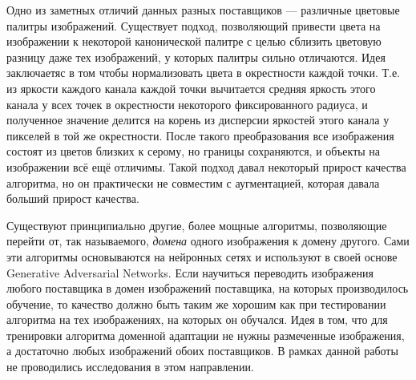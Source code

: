Одно из заметных отличий данных разных поставщиков --- различные цветовые
палитры изображений. Существует подход, позволяющий привести цвета на
изображении к некоторой канонической палитре с целью сблизить цветовую разницу
даже тех изображений, у которых палитры сильно отличаются. Идея заключаетяс в
том чтобы нормализовать цвета в окрестности каждой точки. Т.е. из яркости
каждого канала каждой точки вычитается средняя яркость этого канала у всех точек
в окрестности некоторого фиксированного радиуса, и полученное значение делится
на корень из дисперсии яркостей этого канала у пикселей в той же окрестности.
После такого преобразования все изображения состоят из цветов близких к серому,
но границы сохраняются, и объекты на изображении всё ещё отличимы. Такой подход
давал некоторый прирост качества алгоритма, но он практически не совместим с
аугментацией, которая давала больший прирост качества.

Существуют принципиально другие, более мощные алгоритмы, позволяющие перейти от,
так называемого, \textit{домена} одного изображения к домену другого. Сами эти
алгоритмы основываются на нейронных сетях и используют в своей основе Generative
Adversarial Networks. Если научиться переводить изображения любого поставщика в
домен изображений поставщика, на которых производилось обучение, то качество
должно быть таким же хорошим как при тестировании алгоритма на тех изображениях,
на которых он обучался. Идея в том, что для тренировки алгоритма доменной
адаптации не нужны размеченные изображения, а достаточно любых изображений обоих
поставщиков. В рамках данной работы не проводились исследования в этом
направлении.
